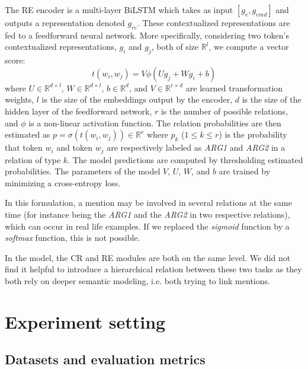 \documentclass[letterpaper]{article} %
\begin{document}
The RE encoder is a multi-layer BiLSTM which takes as input $[g_{e}, g_{emd}]$ and outputs a representation denoted $g_{re}$. These contextualized representations are fed to a feedforward neural network. More specifically, considering two token's contextualized representations, $g_i$ and $g_j$, both of size $\mathbb{R}^{l}$, we compute a vector score:
\begin{equation}
t(w_i, w_j) = V \phi (U g_j + W g_i + b)
\end{equation}
where $U \in \mathbb{R}^{d \times l}$, $W \in \mathbb{R}^{d \times l}$, $b \in \mathbb{R}^{d}$, and $V \in \mathbb{R}^{r \times d}$ are learned transformation weights, $l$ is the size of the embeddings output by the encoder, $d$ is the size of the hidden layer of the feedforward network, $r$ is the number of possible relations, and $\phi$ is a non-linear activation function. The relation probabilities are then estimated as $p = \sigma (t(w_i, w_j)) \in \mathbb{R}^{r}$ where $p_k$ ($1 \leq k \leq r$) is the probability that token $w_i$ and token $w_j$ are respectively labeled as \textit{ARG1} and \textit{ARG2} in a relation of type $k$. The model predictions are computed by thresholding estimated probabilities. The parameters of the model $V$, $U$, $W$, and $b$ are trained by minimizing a cross-entropy loss.

In this formulation, a mention may be involved in several relations at the same time (for instance being the \textit{ARG1} and the \textit{ARG2} in two respective relations), which can occur in real life examples. If we replaced the \textit{sigmoid} function by a \textit{softmax} function, this is not possible.

In the model, the CR and RE modules are both on the same level. We did not find it helpful to introduce a hierarchical relation between these two tasks as they both rely on deeper semantic modeling, i.e. both trying to link mentions.



\section{Experiment setting}

\subsection{Datasets and evaluation metrics}
\end{document}

